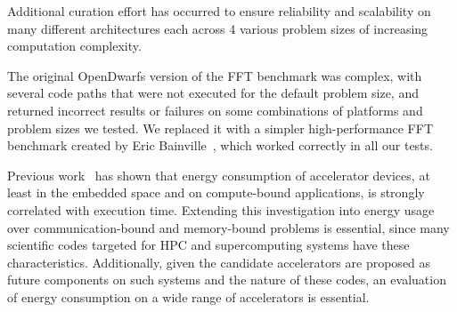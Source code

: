 \documentclass[../document.tex]{subfiles}
\begin{document}
\label{sec:extending_the_opendwarfs_benchmark_suite}



Additional curation effort has occurred to ensure reliability and scalability on many different architectures each across 4 various problem sizes of increasing computation complexity.

The original OpenDwarfs version of the FFT benchmark was complex, with several code paths that were not executed for the default problem size, and returned incorrect results or failures on some combinations of platforms and problem sizes we tested.
We replaced it with a simpler high-performance FFT benchmark created by Eric Bainville~\cite{bainville2010fft}, which worked correctly in all our tests.

Previous work~\cite{johnston2017embedded} has shown that energy consumption of accelerator devices, at least in the embedded space and on compute-bound applications, is strongly correlated with execution time.
Extending this investigation into energy usage over communication-bound and memory-bound problems is essential, since many scientific codes targeted for HPC and supercomputing systems have these characteristics.
Additionally, given the candidate accelerators are proposed as future components on such systems and the nature of these codes, an evaluation of energy consumption on a wide range of accelerators is essential.
\end{document}
